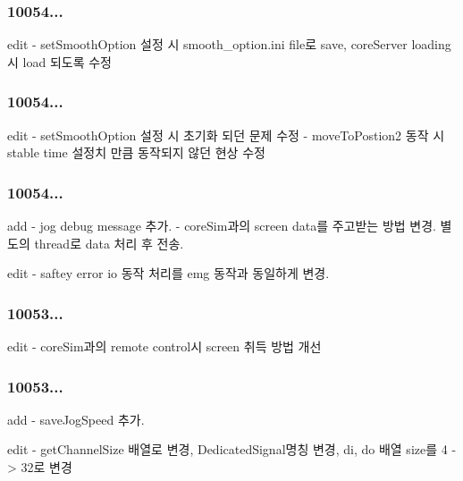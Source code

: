 \subsubsection*{10054...}

\begin{DoxyVerb}     edit - setSmoothOption 설정 시 smooth_option.ini file로 save, coreServer loading 시 load 되도록 수정
\end{DoxyVerb}


\subsubsection*{10054...}

\begin{DoxyVerb}     edit - setSmoothOption 설정 시 초기화 되던 문제 수정
          - moveToPostion2 동작 시 stable time 설정치 만큼 동작되지 않던 현상 수정
\end{DoxyVerb}
 \subsubsection*{10054...}

\begin{DoxyVerb}  add - jog debug message 추가.
      - coreSim과의 screen data를 주고받는 방법 변경. 별도의 thread로 data 처리 후 전송.

  edit - saftey error io 동작 처리를 emg 동작과 동일하게 변경.
\end{DoxyVerb}


\subsubsection*{10053...}

\begin{DoxyVerb}     edit - coreSim과의 remote control시 screen 취득 방법 개선
\end{DoxyVerb}


\subsubsection*{10053...}

\begin{DoxyVerb}  add - saveJogSpeed 추가.

 edit - getChannelSize 배열로 변경, DedicatedSignal명칭 변경,  di, do 배열 size를 4 -> 32로 변경
\end{DoxyVerb}


